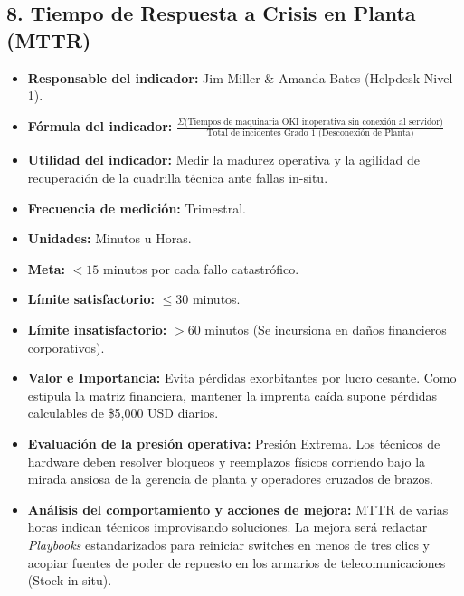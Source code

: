 \documentclass[11pt,a4paper]{article}
\begin{document}
\subsection{8. Tiempo de Respuesta a Crisis en Planta (MTTR)}
\begin{itemize}[label={--}, itemsep=0.1cm]
    \item \textbf{Responsable del indicador:} Jim Miller \& Amanda Bates (Helpdesk Nivel 1).
    \item \textbf{Fórmula del indicador:} $\frac{\Sigma \text{(Tiempos de maquinaria OKI inoperativa sin conexión al servidor)}}{\text{Total de incidentes Grado 1 (Desconexión de Planta)}}$
    \item \textbf{Utilidad del indicador:} Medir la madurez operativa y la agilidad de recuperación de la cuadrilla técnica ante fallas in-situ.
    \item \textbf{Frecuencia de medición:} Trimestral.
    \item \textbf{Unidades:} Minutos u Horas.
    \item \textbf{Meta:} $< 15$ minutos por cada fallo catastrófico.
    \item \textbf{Límite satisfactorio:} $\leq 30$ minutos.
    \item \textbf{Límite insatisfactorio:} $> 60$ minutos (Se incursiona en daños financieros corporativos).
    \item \textbf{Valor e Importancia:} Evita pérdidas exorbitantes por lucro cesante. Como estipula la matriz financiera, mantener la imprenta caída supone pérdidas calculables de \$5,000 USD diarios.
    \item \textbf{Evaluación de la presión operativa:} Presión Extrema. Los técnicos de hardware deben resolver bloqueos y reemplazos físicos corriendo bajo la mirada ansiosa de la gerencia de planta y operadores cruzados de brazos.
    \item \textbf{Análisis del comportamiento y acciones de mejora:} MTTR de varias horas indican técnicos improvisando soluciones. La mejora será redactar \textit{Playbooks} estandarizados para reiniciar switches en menos de tres clics y acopiar fuentes de poder de repuesto en los armarios de telecomunicaciones (Stock in-situ).
\end{itemize}
\end{document}
